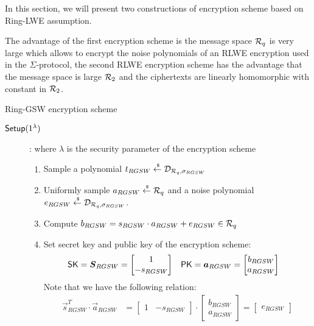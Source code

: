 In this section, we will present two constructions of encryption scheme based on Ring-LWE assumption.

The advantage of the first encryption scheme is the message space ${\mathcal{R}}_q$ is very large which allows to encrypt the noise polynomials of an RLWE encryption used in the $\Sigma$-protocol,
the second RLWE encryption scheme has the advantage that the message space is large ${\mathcal{R}}_2$ and the ciphertexts are linearly homomorphic with constant in ${\mathcal{R}}_2$.


\begin{subsection}{Ring-GSW encryption scheme~\cite{DBLP:journals/tc/KhedrGV16}}
  \begin{description}
  \item[${\mathsf{Setup}}(1^\lambda)$]: where $\lambda$ is the security parameter of the encryption scheme
    \begin{enumerate}
    \item Sample a polynomial $t_{RGSW} \stackrel{{\scriptscriptstyle \mkern4mu \$}}{\gets} \mathcal{D}_{{\mathcal{R}}_q, \sigma_{RGSW}}$
    \item Uniformly sample $a_{RGSW} \stackrel{{\scriptscriptstyle \mkern4mu \$}}{\gets} {\mathcal{R}}_q$ and a noise polynomial $e_{RGSW} \stackrel{{\scriptscriptstyle \mkern4mu \$}}{\gets} \mathcal{D}_{{\mathcal{R}}_q, \sigma_{RGSW}}$.
    \item Compute $b_{RGSW} = s_{RGSW} \cdot a_{RGSW} + e_{RGSW} \in {\mathcal{R}}_q$
    \item Set secret key and public key of the encryption scheme:
      \begin{align*}
        \SK &= \vec{S}_{RGSW} =\begin{bmatrix} 1 \\ -s_{RGSW} \end{bmatrix}  & \PK &= \vec{a}_{RGSW} =  \begin{bmatrix} b_{RGSW} \\ a_{RGSW}\end{bmatrix}
      \end{align*}
      Note that we have the following relation:
      \begin{align*}
        \vec{s}_{RGSW}^T \cdot \vec{a}_{RGSW} &= \begin{bmatrix} 1 & -s_{RGSW} \end{bmatrix} \cdot \begin{bmatrix} b_{RGSW} \\ a_{RGSW}\end{bmatrix} = \begin{bmatrix} e_{RGSW} \end{bmatrix}

\end{align*}
\end{enumerate}
\end{description}
\end{subsection}
